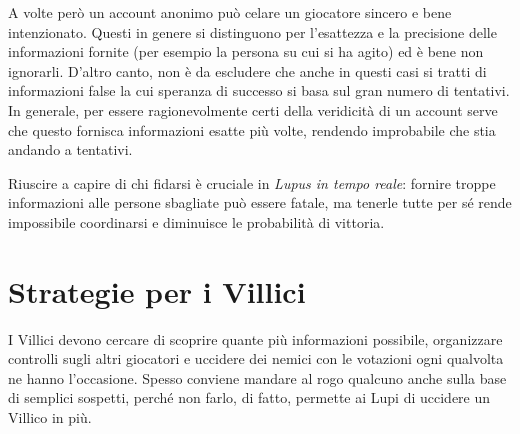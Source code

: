 \documentclass[a4paper,10pt]{article}
\begin{document}
A volte però un account anonimo può celare un giocatore sincero e bene intenzionato. Questi in genere si distinguono per l'esattezza e la precisione delle informazioni fornite (per esempio la persona su cui si ha agito) ed è bene non ignorarli. D'altro canto, non è da escludere che anche in questi casi si tratti di informazioni false la cui speranza di successo si basa sul gran numero di tentativi. In generale, per essere ragionevolmente certi della veridicità di un account serve che questo fornisca informazioni esatte più volte, rendendo improbabile che stia andando a tentativi.

Riuscire a capire di chi fidarsi è cruciale in \emph{Lupus in tempo reale}: fornire troppe informazioni alle persone sbagliate può essere fatale, ma tenerle tutte per sé rende impossibile coordinarsi e diminuisce le probabilità di vittoria.


\section{Strategie per i Villici}

I Villici devono cercare di scoprire quante più informazioni possibile, organizzare controlli sugli altri giocatori e uccidere dei nemici con le votazioni ogni qualvolta ne hanno l'occasione. Spesso conviene mandare al rogo qualcuno anche sulla base di semplici sospetti, perché non farlo, di fatto, permette ai Lupi di uccidere un Villico in più.
\end{document}
